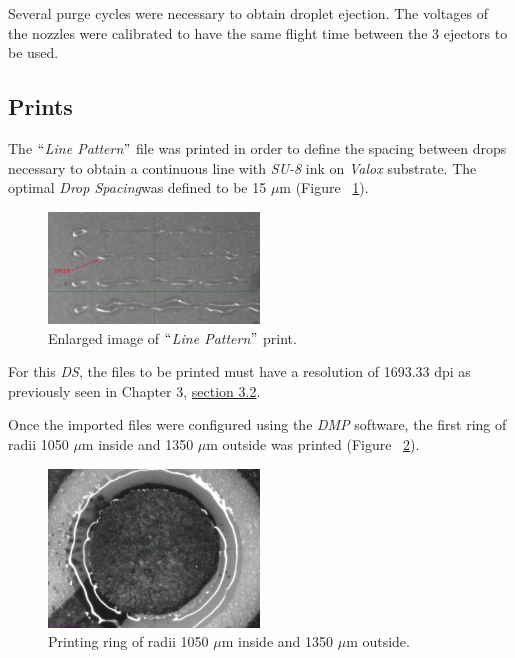 Several purge cycles were necessary to obtain droplet ejection. The voltages of the nozzles were calibrated to have the same flight time between the 3 ejectors to be used.

\subsection{Prints}
The $``$\textit{Line Pattern}$"$ file was printed in order to define the spacing between drops necessary to obtain a continuous line with \textit{SU-8} ink on \textit{Valox} substrate. The optimal \textit{Drop Spacing}was defined to be 15 $\mu$m (Figure ~\ref{fig:Figura_LinePattern_SU8}).

\begin{figure}[H]
  \centering
    \includegraphics[width=0.5\textwidth]{Figures/Figura_LinePattern_SU8}
  \caption{Enlarged image of $``$\textit{Line Pattern}$"$ print.}
  \label{fig:Figura_LinePattern_SU8}
\end{figure}

For this \emph{DS}, the files to be printed must have a resolution of 1693.33 dpi as previously seen in Chapter 3, \hyperref[sec:calib_impresora]{section 3.2}.

Once the imported files were configured using the \textit{DMP} software, the first ring of radii 1050 $\mu$m inside and 1350 $\mu$m outside was printed (Figure ~\ref{fig:Figura_Anillo105a135_SU8}).

\begin{figure}[H]
  \centering
    \includegraphics[width=0.5\textwidth]{Figures/Figura_Anillo105a135_SU8}
  \caption{Printing ring of radii 1050 $\mu$m inside and 1350 $\mu$m outside.}
  \label{fig:Figura_Anillo105a135_SU8}
\end{figure}

